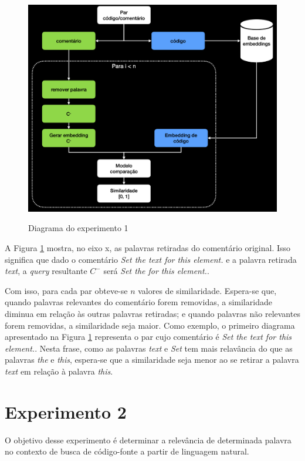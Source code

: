 \begin{figure}[H]
    \centering
        \caption{Diagrama do experimento 1}
        \includegraphics[scale=0.3]{imagens/proposta-experimental/experiment-1.png}
        \label{fig:experiment-1-diagram}
\end{figure}

A Figura \ref{fig:experiment-1-diagram} mostra, no eixo x, as palavras retiradas do comentário original. Isso significa que dado o comentário \textit{Set the text for this element.} e a palavra retirada \textit{text}, a \textit{query} resultante $C^-$ será \textit{Set the for this element.}.

Com isso, para cada par obteve-se $n$ valores de similaridade. Espera-se que, quando palavras relevantes do comentário forem removidas, a similaridade diminua em relação às outras palavras retiradas; e quando palavras não relevantes forem removidas, a similaridade seja maior. Como exemplo, o primeiro diagrama apresentado na Figura \ref{fig:experiment-1-diagram} representa o par cujo comentário é \textit{Set the text for this element.}. Nesta frase, como as palavras \textit{text} e \textit{Set} tem mais relavância do que as palavras \textit{the} e \textit{this}, espera-se que a similaridade seja menor ao se retirar a palavra \textit{text} em relação à palavra \textit{this}.

\section{Experimento 2}
\label{sec:experiments:experiment-2}
O objetivo desse experimento é determinar a relevância de determinada palavra no contexto de busca de código-fonte a partir de linguagem natural.

